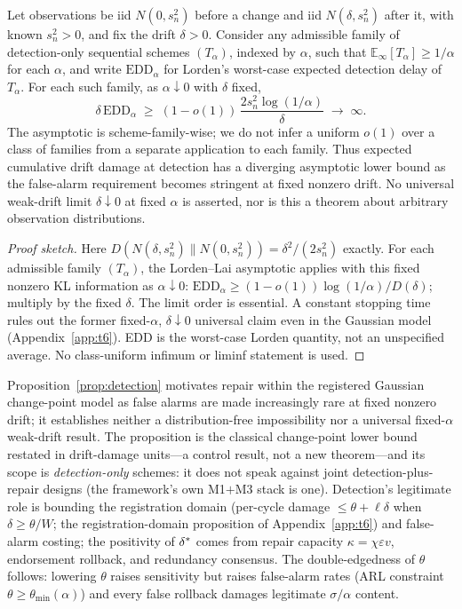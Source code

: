 \begin{proposition}
\label{prop:detection}
Let observations be iid $N(0,s_n^2)$ before a change and iid
$N(\delta,s_n^2)$ after it, with known $s_n^2>0$, and fix the drift
$\delta>0$. Consider any admissible family of detection-only sequential
schemes $(T_\alpha)$, indexed by $\alpha$, such that
$\mathbb{E}_\infty[T_\alpha]\ge1/\alpha$ for each $\alpha$, and write
$\mathrm{EDD}_\alpha$ for Lorden's worst-case expected detection delay of
$T_\alpha$. For each such family, as $\alpha\downarrow0$ with $\delta$ fixed,
\[
\delta\,\mathrm{EDD}_\alpha\;\ge\;(1-o(1))\,
\frac{2s_n^2\log(1/\alpha)}{\delta}\;\longrightarrow\;\infty .
\]
The asymptotic is scheme-family-wise; we do not infer a uniform $o(1)$ over a
class of families from a separate application to each family.
Thus expected cumulative drift damage at detection has a diverging
asymptotic lower bound as the false-alarm requirement becomes stringent at
fixed nonzero drift. No universal weak-drift limit
$\delta\downarrow0$ at fixed $\alpha$ is asserted, nor is this a theorem
about arbitrary observation distributions.
\end{proposition}
\begin{proof}[Proof sketch]
Here $D(N(\delta,s_n^2)\|N(0,s_n^2))=\delta^2/(2s_n^2)$ exactly. For each
admissible family $(T_\alpha)$, the Lorden--Lai asymptotic applies with this
fixed nonzero KL information as $\alpha\downarrow0$:
$\mathrm{EDD}_\alpha\ge(1-o(1))\log(1/\alpha)/D(\delta)$; multiply by the
fixed $\delta$. The limit order is essential. A constant stopping time rules
out the former fixed-$\alpha$, $\delta\downarrow0$ universal claim even in
the Gaussian model (Appendix~\ref{app:t6}). EDD is the worst-case Lorden
quantity, not an unspecified average. No class-uniform infimum or liminf
statement is used.
\end{proof}

Proposition~\ref{prop:detection} motivates repair within the registered
Gaussian change-point model as false alarms are made increasingly rare at
fixed nonzero drift; it establishes neither a distribution-free impossibility
nor a universal fixed-$\alpha$ weak-drift result. The proposition is the classical
change-point lower bound \citep{lorden1971,lai1995} restated in drift-damage
units---a control result, not a new theorem---and its scope is
\emph{detection-only} schemes: it does not speak against joint
detection-plus-repair designs (the framework's own M1$+$M3 stack is one).
Detection's legitimate role is bounding the
registration domain (per-cycle damage $\le\theta+\ell\delta$
when $\delta\ge\theta/W$; the registration-domain proposition of
Appendix~\ref{app:t6}) and false-alarm costing; the positivity of
$\delta^{*}$ comes from repair capacity $\kappa=\chi\varepsilon v$,
endorsement rollback, and redundancy consensus. The double-edgedness of
$\theta$ follows: lowering $\theta$ raises sensitivity but raises false-alarm
rates (ARL constraint $\theta\ge\theta_{\min}(\alpha)$) and every false
rollback damages legitimate $\sigma/\alpha$ content.

